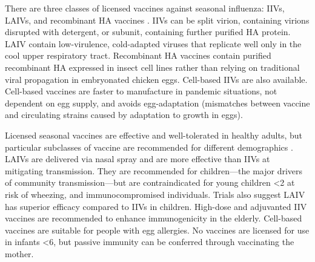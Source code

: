 There are three classes of licensed vaccines against seasonal influenza: \glspl{IIV}, \glspl{LAIV}, and recombinant \gls{HA} vaccines \autocite{houser2015InfluenzaVaccinesChallenges,krammer2019HumanAntibodyResponse}.
\Glspl{IIV} can be split virion, containing virions disrupted with detergent, or subunit, containing further purified \gls{HA} protein.
\Gls{LAIV} contain low-virulence, cold-adapted viruses that replicate well only in the cool upper respiratory tract.
Recombinant \gls{HA} vaccines contain purified recombinant \gls{HA} expressed in insect cell lines rather than relying on traditional viral propagation in embryonated chicken eggs.
Cell-based \glspl{IIV} are also available. 
Cell-based vaccines are faster to manufacture in pandemic situations, not dependent on egg supply, and avoids egg-adaptation (mismatches between vaccine and circulating strains caused by adaptation to growth in eggs).

Licensed seasonal vaccines are effective and well-tolerated in healthy adults, but particular subclasses of vaccine are recommended for different demographics \autocite{bresee2018InactivatedInfluenzaVaccines,luke2018InfluenzaVaccineLive,ramsay2020InfluenzaGreenBook}.
\glspl{LAIV} are delivered via nasal spray and are more effective than \glspl{IIV} at mitigating transmission. 
They are recommended for children---the major drivers of community transmission---but are contraindicated for young children \SI{<2}{\year} at risk of wheezing, and immunocompromised individuals.
Trials also suggest \gls{LAIV} has superior efficacy compared to \glspl{IIV} in children.
High-dose and adjuvanted \gls{IIV} vaccines are recommended to enhance immunogenicity in the elderly.
Cell-based vaccines are suitable for people with egg allergies.
No vaccines are licensed for use in infants \SI{<6}{\month}, but passive immunity can be conferred through vaccinating the mother.

